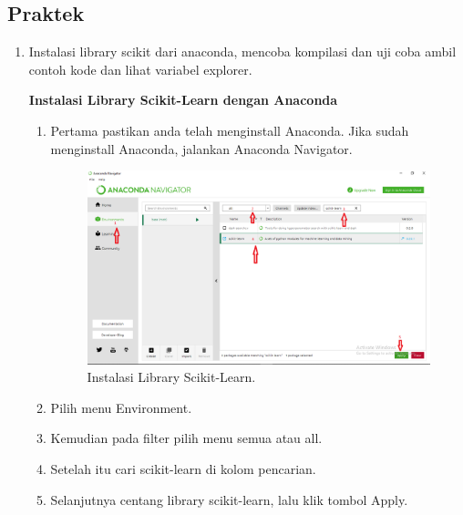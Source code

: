 \subsection{Praktek}
\begin{enumerate}
	\item Instalasi  library  scikit  dari  anaconda,  mencoba  kompilasi  dan  uji  coba  ambil contoh kode dan lihat variabel explorer.
	
	\textbf{Instalasi Library Scikit-Learn dengan Anaconda}
	\begin{enumerate}
		\item Pertama pastikan anda telah menginstall Anaconda. Jika sudah menginstall Anaconda, jalankan Anaconda Navigator.
		\begin{figure}[H]
			\includegraphics[width=1\textwidth]{figures/1174002/chapter1/praktek/ins.png}
			\centering
			\caption{Instalasi Library Scikit-Learn.}
		\end{figure}
		\item Pilih menu Environment.
		\item Kemudian pada filter pilih menu semua atau all.
		\item Setelah itu cari scikit-learn di kolom pencarian.
		\item Selanjutnya centang library scikit-learn, lalu klik tombol Apply.
	\end{enumerate}


\end{enumerate}
